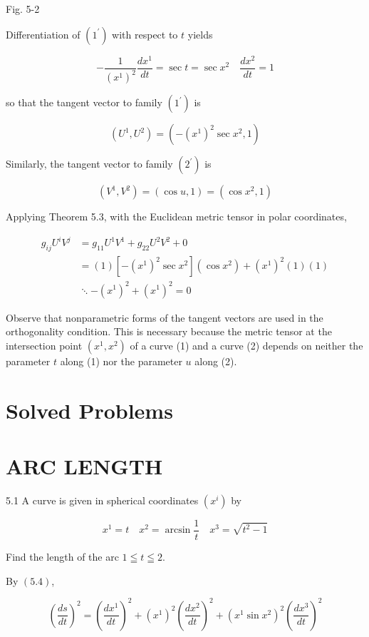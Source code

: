 \documentclass[10pt]{article}
\begin{document}
Fig. 5-2

Differentiation of $\left(1^{\prime}\right)$ with respect to $t$ yields

$$
-\frac{1}{\left(x^{1}\right)^{2}} \frac{d x^{1}}{d t}=\sec t=\sec x^{2} \quad \frac{d x^{2}}{d t}=1
$$

so that the tangent vector to family $\left(1^{\prime}\right)$ is

$$
\left(U^{1}, U^{2}\right)=\left(-\left(x^{1}\right)^{2} \sec x^{2}, 1\right)
$$

Similarly, the tangent vector to family $\left(2^{\prime}\right)$ is

$$
\left(V^{1}, V^{2}\right)=(\cos u, 1)=\left(\cos x^{2}, 1\right)
$$

Applying Theorem 5.3, with the Euclidean metric tensor in polar coordinates,

$$
\begin{aligned}
g_{i j} U^{i} V^{j} & =g_{11} U^{1} V^{1}+g_{22} U^{2} V^{2}+0 \\
& =(1)\left[-\left(x^{1}\right)^{2} \sec x^{2}\right]\left(\cos x^{2}\right)+\left(x^{1}\right)^{2}(1)(1) \\
& \ddots-\left(x^{1}\right)^{2}+\left(x^{1}\right)^{2}=0
\end{aligned}
$$

Observe that nonparametric forms of the tangent vectors are used in the orthogonality condition. This is necessary because the metric tensor at the intersection point $\left(x^{1}, x^{2}\right)$ of a curve (1) and a curve (2) depends on neither the parameter $t$ along (1) nor the parameter $u$ along (2).

\section*{Solved Problems}
\section*{ARC LENGTH}
5.1 A curve is given in spherical coordinates $\left(x^{i}\right)$ by

$$
x^{1}=t \quad x^{2}=\arcsin \frac{1}{t} \quad x^{3}=\sqrt{t^{2}-1}
$$

Find the length of the arc $1 \leqq t \leqq 2$.

By $(5.4)$,

$$
\left(\frac{d s}{d t}\right)^{2}=\left(\frac{d x^{1}}{d t}\right)^{2}+\left(x^{1}\right)^{2}\left(\frac{d x^{2}}{d t}\right)^{2}+\left(x^{1} \sin x^{2}\right)^{2}\left(\frac{d x^{3}}{d t}\right)^{2}
$$
\end{document}
